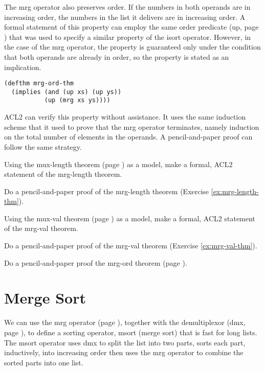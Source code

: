 The mrg operator also preserves order.
If the numbers in both operands are in increasing order,
the numbers in the list it delivers are in increasing order.
A formal statement of this property can employ the same order predicate
(up, page \pageref{defun:up}) that was used to specify a
similar property of the isort operator.
However, in the case of the mrg operator,
the property is guaranteed only under the condition
that both operands are already in order,
so the property is stated as an implication.

\label{defthm:mrg-ord}
\begin{Verbatim}
(defthm mrg-ord-thm
  (implies (and (up xs) (up ys))
           (up (mrg xs ys))))
\end{Verbatim}

ACL2 can verify this property without assistance.
It uses the same induction scheme that it used
to prove that the mrg operator terminates,
namely induction on the total number of elements in the operands.
A pencil-and-paper proof can follow the same strategy.

\begin{ExerciseList}
\Exercise
\label{ex:mrg-length-thm}
Using the mux-length theorem (page \pageref{mux-length-thm})
as a model, make a formal, ACL2 statement of the mrg-length theorem.

\Exercise
Do a pencil-and-paper proof of the mrg-length theorem (Exercise \ref{ex:mrg-length-thm}).

\Exercise
\label{ex:mrg-val-thm}
Using the mux-val theorem (page \pageref{thm:mux-val})
as a model, make a formal, ACL2 statement of the mrg-val theorem.

\Exercise
Do a pencil-and-paper proof of the mrg-val theorem (Exercise \ref{ex:mrg-val-thm}).

\Exercise
Do a pencil-and-paper proof the mrg-ord theorem (page \pageref{defthm:mrg-ord}).
\end{ExerciseList}

\section{Merge Sort}
\label{sec:msort}

We can use the mrg operator (page \pageref{defun:mrg}),
together with the demultiplexor (dmx, page \pageref{dmx-defun}),
to define a sorting operator, msort (merge sort) that is fast for long lists.
The msort operator uses dmx to split the list into two parts,
sorts each part, inductively, into increasing order
then uses the mrg operator to combine the sorted parts into one list.

